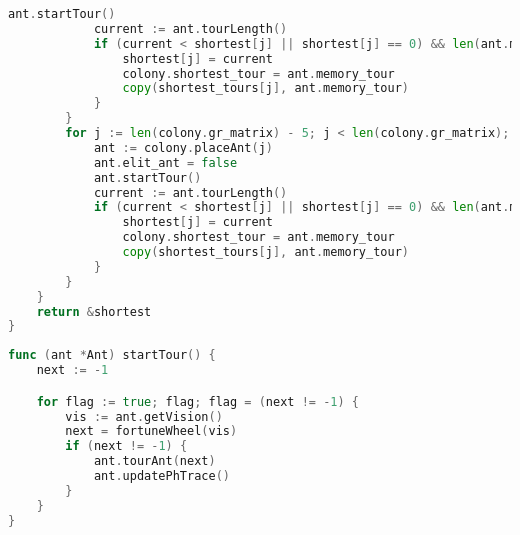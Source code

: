 \begin{lstlisting}[language=Go, label=lst:alg:Parallel1, caption=Реализация муравьиного алгоритма]
            ant.startTour()
            current := ant.tourLength()
            if (current < shortest[j] || shortest[j] == 0) && len(ant.memory_tour) ==  len(colony.gr_matrix){
                shortest[j] = current
                colony.shortest_tour = ant.memory_tour
                copy(shortest_tours[j], ant.memory_tour)
            }
        }
        for j := len(colony.gr_matrix) - 5; j < len(colony.gr_matrix); j++ {
            ant := colony.placeAnt(j)
            ant.elit_ant = false
            ant.startTour()
            current := ant.tourLength()
            if (current < shortest[j] || shortest[j] == 0) && len(ant.memory_tour) ==  len(colony.gr_matrix){
                shortest[j] = current
                colony.shortest_tour = ant.memory_tour
                copy(shortest_tours[j], ant.memory_tour)
            }
        }
    }
    return &shortest
}
\end{lstlisting}

\par \text{           }
\begin{lstlisting}[language=Go, label=lst:alg:Parallel2, caption=Реализация перемещений муравья]
func (ant *Ant) startTour() {
    next := -1

    for flag := true; flag; flag = (next != -1) {
        vis := ant.getVision()
        next = fortuneWheel(vis)
        if (next != -1) {
            ant.tourAnt(next)
            ant.updatePhTrace()
        }
    } 
}
\end{lstlisting}
\par \text{           }
\par \text{           }
\par \text{           }
\par \text{           }

